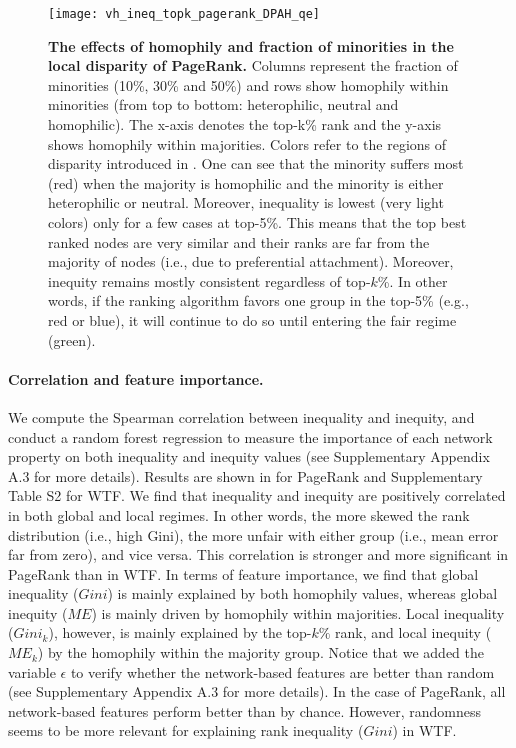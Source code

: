 \documentclass[fleqn,10pt]{wlscirep}
\begin{document}
\begin{figure}[t!]
    \centering
    \texttt{[image: vh\_ineq\_topk\_pagerank\_DPAH\_qe]}
    \caption{\textbf{The effects of homophily and fraction of minorities in the local disparity of PageRank.} Columns represent the fraction of minorities (10\%, 30\% and 50\%) and rows show homophily within minorities (from top to bottom: heterophilic, neutral and homophilic). 
%
    The x-axis denotes the top-k\% rank and the y-axis shows homophily within majorities. 
%
    Colors refer to the regions of disparity introduced in . 
    One can see that the minority suffers most (red) when the majority is homophilic and the minority is either heterophilic or neutral. 
    Moreover, inequality is lowest (very light colors) only for a few cases at top-5\%. 
%
    This means that the top best ranked nodes are very similar and their ranks are far from the majority of nodes (i.e., due to preferential attachment). 
    Moreover, inequity remains mostly consistent regardless of top-$k$\%. 
%
    In other words, if the ranking algorithm favors one group in the top-5\% (e.g., red or blue), it will continue to do so until entering the fair regime (green).}
%
    \label{fig:h_pagerank}
\end{figure}



\paragraph{Correlation and feature importance.} 
We compute the Spearman correlation between inequality and inequity, and conduct a random forest regression to %
measure the importance of each network property on both inequality and inequity values (see Supplementary Appendix A.3 for more details). Results are shown in  for PageRank and Supplementary Table S2 for WTF. 
We find that inequality and inequity are positively correlated in both global and local regimes. 
In other words, the more skewed the rank distribution (i.e., high Gini), the more unfair with either group (i.e., mean error far from zero), and vice versa. This correlation is stronger and more significant in PageRank than in WTF. %
In terms of feature importance, we find that global inequality ($Gini$) is mainly explained by both homophily values, whereas global inequity ($ME$) is mainly driven by homophily within majorities. Local inequality ($Gini_k$), however, is mainly explained by the top-$k\%$ rank, and local inequity ($ME_k$) by the homophily within the majority group. %
Notice that we added the variable $\epsilon$ to verify whether the network-based features are better than random (see Supplementary Appendix A.3 for more details). In the case of PageRank, all network-based features perform better than by chance. However, randomness seems to be more relevant for explaining rank inequality ($Gini$) in WTF.
\end{document}
